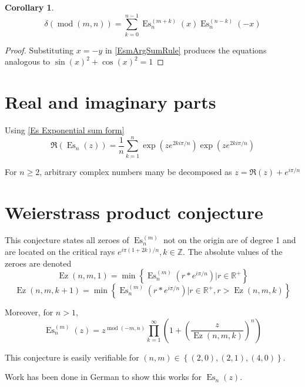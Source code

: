 \documentclass[]{article}
\DeclareMathOperator{\es}{Es}
\DeclareMathOperator{\ez}{Ez}
\DeclareMathOperator{\md}{mod}
\newcommand{\pqty}[1]{{\left(#1\right)}}
\newcommand{\Bqty}[1]{{\left\{#1\right\}}}
\newtheorem{corollary}[theorem]{Corollary}
\numberwithin{equation}{section}
\begin{document}
	\begin{corollary}
		\begin{equation}
		\delta\pqty{\md\pqty{m,n}}=
		\sum_{k=0}^{n-1}
		\es_n^{(m+k)}\pqty{x}
		\es_n^{(n-k)}\pqty{-x}
		\end{equation}
	\end{corollary}
	\begin{proof}
		Substituting $x=-y$ in \eqref{EsmArgSumRule} produces the equations analogous to $\sin\pqty{x}^2 + \cos\pqty{x}^2=1$
	\end{proof}

	\section{Real and imaginary parts}
	Using \eqref{Es Exponential sum form}
	\begin{equation}
	\Re\pqty{\es_n\pqty{z}}=
	\frac{1}{n}\sum _{k=1}^n \exp\pqty{ze^{2ki\pi/n}}\exp\pqty{ze^{2ki\pi/n}}
	\end{equation}
	
	For $n\geq 2$, arbitrary complex numbers many be decomposed as $z=\Re\pqty{z}+e^{i\pi/n}$
	
	\section{Weierstrass product conjecture}
	This conjecture states all zeroes of $\es_n^{(m)}$ not on the origin are of degree 1 and are located on the critical rays $e^{i\pi(1+2k)/n}, k\in\mathbb{Z}$.
	The absolute values of the zeroes are denoted
	\begin{equation}
	\ez\pqty{n,m,1}=\min\Bqty{\es_n^{(m)}\pqty{r*e^{i\pi/n}}\Big\vert r\in\mathbb{R}^+}
	\end{equation}
	\begin{equation}
	\ez\pqty{n,m,k+1}=\min\Bqty{\es_n^{(m)}\pqty{r*e^{i\pi/n}}\Big\vert r\in\mathbb{R}^+, r>\ez\pqty{n,m,k}}
	\end{equation}
	
	Moreover, for $n>1$,
	\begin{equation}
	\es_n^{(m)}\pqty{z}=z^{\md\pqty{-m,n}}\prod_{k=1}^{\infty}\pqty{1+\pqty{\frac{z}{\ez\pqty{n,m,k}}}^n}
	\end{equation}
	
	This conjecture is easily verifiable for $\pqty{n,m}\in\Bqty{\pqty{2,0}, \pqty{2,1}, \pqty{4,0}}$.
	
	Work has been done in German to show this works for \(\es_n\pqty{z}\).
	
\end{document}
